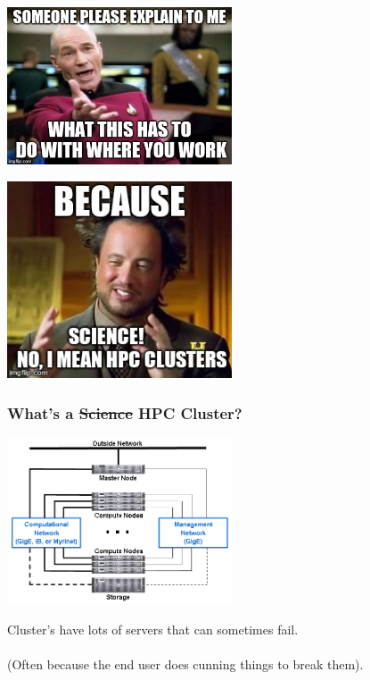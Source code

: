 \documentclass{beamer}
\begin{document}
\begin{frame}
\begin{center}
	\includegraphics[width=0.5\textwidth]{imgs/picard.jpg}
\end{center}
\end{frame}

\begin{frame}
\begin{center}
	\includegraphics[width=0.5\textwidth]{imgs/scienceguy.jpg}
\end{center}
\end{frame}

\begin{frame}
\frametitle{What's a \sout{Science} HPC Cluster?}
    \begin{center}
     \includegraphics[width=0.5\textwidth]{imgs/cluster_anatomy.png}
     \end{center}
Cluster's have lots of servers that can sometimes fail.\\~\\
(Often because the end user does cunning things to break them).
\end{frame}
\end{document}
